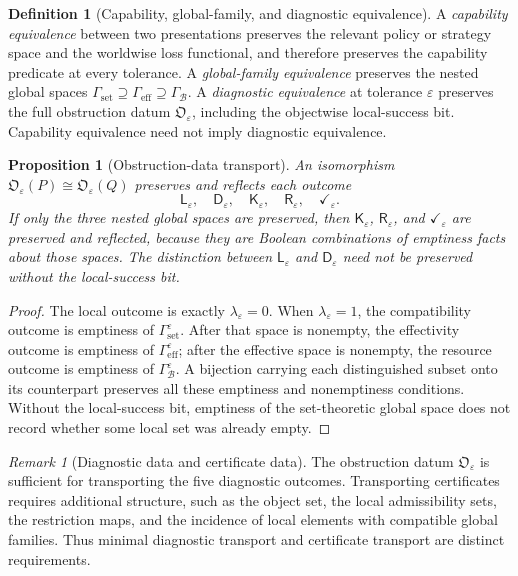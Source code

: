 \documentclass[11pt]{article}
\theoremstyle{plain}
\newtheorem{proposition}[theorem]{Proposition}
\theoremstyle{definition}
\newtheorem{definition}[theorem]{Definition}
\theoremstyle{remark}
\newtheorem{remark}[theorem]{Remark}
\newcommand{\eps}{\varepsilon}
\begin{document}
\begin{definition}[Capability, global-family, and diagnostic equivalence]
\label{def:equivalence-levels}
A \emph{capability equivalence} between two presentations preserves the relevant
policy or strategy space and the worldwise loss functional, and therefore
preserves the capability predicate at every tolerance. A \emph{global-family
equivalence} preserves the nested global spaces
$\Gamma_{\mathrm{set}}\supseteq\Gamma_{\mathrm{eff}}\supseteq
\Gamma_{\mathcal B}$. A \emph{diagnostic equivalence} at tolerance $\eps$
preserves the full obstruction datum $\mathfrak O_\eps$, including the
objectwise local-success bit. Capability equivalence need not imply diagnostic
equivalence.
\end{definition}

\begin{proposition}[Obstruction-data transport]
\label{prop:obstruction-transport}
An isomorphism $\mathfrak O_\eps(P)\cong\mathfrak O_\eps(Q)$ preserves and
reflects each outcome
\[
\mathsf L_\eps,\quad\mathsf D_\eps,\quad
\mathsf K_\eps,\quad\mathsf R_\eps,\quad\checkmark_\eps.
\]
If only the three nested global spaces are preserved, then
$\mathsf K_\eps$, $\mathsf R_\eps$, and $\checkmark_\eps$ are preserved and
reflected, because they are Boolean combinations of emptiness facts about those
spaces. The distinction between $\mathsf L_\eps$ and $\mathsf D_\eps$ need not
be preserved without the local-success bit.
\end{proposition}

\begin{proof}
The local outcome is exactly $\lambda_\eps=0$. When $\lambda_\eps=1$, the
compatibility outcome is emptiness of $\Gamma_{\mathrm{set}}^\eps$. After that
space is nonempty, the effectivity outcome is emptiness of
$\Gamma_{\mathrm{eff}}^\eps$; after the effective space is nonempty, the
resource outcome is emptiness of $\Gamma_{\mathcal B}^\eps$. A bijection
carrying each distinguished subset onto its counterpart preserves all these
emptiness and nonemptiness conditions. Without the local-success bit, emptiness
of the set-theoretic global space does not record whether some local set was
already empty.
\end{proof}

\begin{remark}[Diagnostic data and certificate data]
The obstruction datum $\mathfrak O_\eps$ is sufficient for transporting the
five diagnostic outcomes. Transporting certificates requires additional
structure, such as the object set, the local admissibility sets, the restriction
maps, and the incidence of local elements with compatible global families. Thus
minimal diagnostic transport and certificate transport are distinct requirements.
\end{remark}
\end{document}
